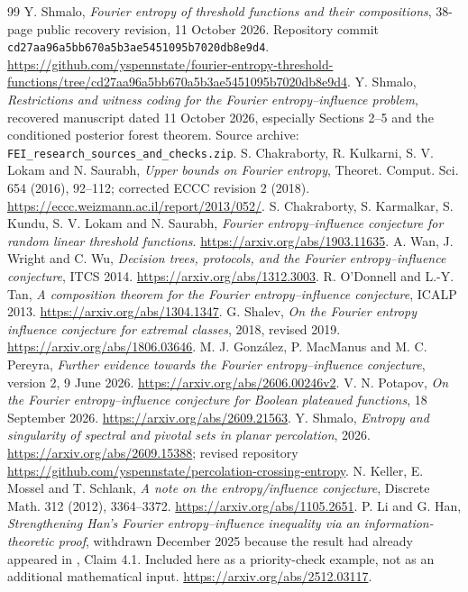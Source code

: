 \documentclass[11pt]{article}
\begin{document}
\begin{thebibliography}{99}
 Y. Shmalo,
\emph{Fourier entropy of threshold functions and their compositions},
38-page public recovery revision, 11 October 2026.
Repository commit \texttt{cd27aa96a5bb670a5b3ae5451095b7020db8e9d4}.
\url{https://github.com/yspennstate/fourier-entropy-threshold-functions/tree/cd27aa96a5bb670a5b3ae5451095b7020db8e9d4}.
 Y. Shmalo, \emph{Restrictions and witness coding for the Fourier entropy--influence problem}, recovered manuscript dated 11 October 2026, especially Sections 2--5 and the conditioned posterior forest theorem. Source archive: \texttt{FEI\_research\_sources\_and\_checks.zip}.
 S. Chakraborty, R. Kulkarni, S. V. Lokam and N. Saurabh, \emph{Upper bounds on Fourier entropy}, Theoret. Comput. Sci. 654 (2016), 92--112; corrected ECCC revision 2 (2018). \url{https://eccc.weizmann.ac.il/report/2013/052/}.
 S. Chakraborty, S. Karmalkar, S. Kundu, S. V. Lokam and N. Saurabh, \emph{Fourier entropy--influence conjecture for random linear threshold functions}. \url{https://arxiv.org/abs/1903.11635}.
 A. Wan, J. Wright and C. Wu, \emph{Decision trees, protocols, and the Fourier entropy--influence conjecture}, ITCS 2014. \url{https://arxiv.org/abs/1312.3003}.
 R. O'Donnell and L.-Y. Tan, \emph{A composition theorem for the Fourier entropy--influence conjecture}, ICALP 2013. \url{https://arxiv.org/abs/1304.1347}.
 G. Shalev, \emph{On the Fourier entropy influence conjecture for extremal classes}, 2018, revised 2019. \url{https://arxiv.org/abs/1806.03646}.
 M. J. Gonz\'alez, P. MacManus and M. C. Pereyra, \emph{Further evidence towards the Fourier entropy--influence conjecture}, version 2, 9 June 2026. \url{https://arxiv.org/abs/2606.00246v2}.
 V. N. Potapov, \emph{On the Fourier entropy--influence conjecture for Boolean plateaued functions}, 18 September 2026. \url{https://arxiv.org/abs/2609.21563}.
 Y. Shmalo, \emph{Entropy and singularity of spectral and pivotal sets in planar percolation}, 2026. \url{https://arxiv.org/abs/2609.15388}; revised repository \url{https://github.com/yspennstate/percolation-crossing-entropy}.
 N. Keller, E. Mossel and T. Schlank, \emph{A note on the entropy/influence conjecture}, Discrete Math. 312 (2012), 3364--3372. \url{https://arxiv.org/abs/1105.2651}.
 P. Li and G. Han, \emph{Strengthening Han's Fourier entropy--influence inequality via an information-theoretic proof}, withdrawn December 2025 because the result had already appeared in \cite{KMS}, Claim 4.1. Included here as a priority-check example, not as an additional mathematical input. \url{https://arxiv.org/abs/2512.03117}.

\end{thebibliography}
\end{document}
